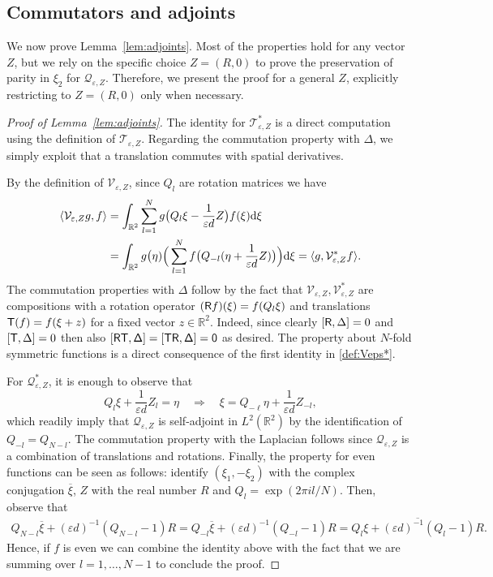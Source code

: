 \documentclass[11pt,reqno,a4paper]{amsart}
\def\dd{{\rm d}}
\def\eps{\varepsilon}
\def\RR {\mathbb{R}}
\newcommand{\cQ}{\mathcal{Q}}
\newcommand{\cT}{\mathcal{T}}
\newcommand{\cV}{\mathcal{V}}
\newcommand{\1}{\mathbbm{1}}
\theoremstyle{definition}
\theoremstyle{definition}
\numberwithin{equation}{section}
\begin{document}
\subsection{Commutators and adjoints}\label{app:proofs_adjoints}
We now prove Lemma~\ref{lem:adjoints}. Most of the properties hold for any vector $Z$, but we rely on the specific choice $Z=(R,0)$ to prove the preservation of parity in $\xi_2$ for $\cQ_{\eps,Z}$. Therefore, we present the proof for a general $Z$, explicitly restricting to $Z=(R,0)$ only when necessary.
\begin{proof}[Proof of Lemma~\ref{lem:adjoints}]
    The identity for $\cT_{\eps,Z}^*$ is a direct computation using the definition of $\cT_{\eps,Z}$. Regarding the commutation property with $\Delta$, we simply exploit that a translation commutes with spatial derivatives.


By the definition of $\cV_{\eps,Z}$, since $Q_l$ are rotation matrices we have 
\begin{align}
    \langle \cV_{\eps,Z}g,f\rangle&=\int_{\RR^2}\sum_{l=1}^N g\big(Q_{l}\xi-\frac{1}{\eps d}Z\big) f(\xi)\dd \xi\\ &=\int_{\RR^2}g\big(\eta) \Big(\sum_{l=1}^N f\big(Q_{-l}(\eta+\frac{1}{\eps d}Z)\big)\Big)\dd \xi=\langle g,\cV_{\eps,Z}^* f\rangle.
\end{align}
The commutation properties with $\Delta$ follow by the fact that $\cV_{\eps,Z},\cV_{\eps,Z}^*$ are compositions with a rotation operator $({\sf R}f)(\xi)=f(Q_l\xi)$ and translations ${\sf T}(f)=f(\xi+z)$ for a fixed vector $z\in \RR^2$. Indeed, since clearly $[{\sf R},\Delta]=0$ and $[{\sf T},\Delta]=0$ then also $[\sf{R}\sf{T},\Delta]=[\sf{T}\sf{R},\Delta]=0$ as desired. 
The property about $N$-fold symmetric functions is a direct consequence of the first identity in \cref{def:Veps*}.



For $\cQ_{\eps,Z}^*$, it is enough to observe that 
\begin{equation}
 Q_l\xi+\frac{1}{\eps d}Z_l=\eta\quad \Longrightarrow\quad    \xi=Q_{-\ell}\eta+\frac{1}{\eps d}Z_{-l},
\end{equation}
which readily imply that $\cQ_{\eps,Z}$ is self-adjoint in $L^2(\RR^2)$ by the identification of $Q_{-l}=Q_{N-l}$. The commutation property with the Laplacian follows since $\cQ_{\eps,Z}$ is a combination of translations and rotations. Finally, the property for even functions can be seen as follows: identify $(\xi_1,-\xi_2)$ with the complex conjugation $\overline{\xi}$, $Z$ with the real number $R$ and $Q_l=\exp(2\pi i l/N)$. Then, observe that 
\begin{align}
    Q_{N-l} \overline{\xi}+(\eps d)^{-1}(Q_{N-l}-1)R= Q_{-l} \overline{\xi}+(\eps d)^{-1}(Q_{-l}-1)R=\overline{Q_{l} \xi+(\eps d)^{-1}(Q_{l}-1)R}.
\end{align}
Hence, if $f$ is even we can combine the identity above with the fact that we are summing over $l=1,\dots, N-1$ to conclude the proof. 


\end{proof}
\end{document}

